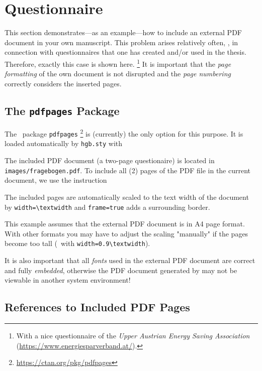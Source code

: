 \chapter{Questionnaire}
\label{app:Questionnaire}

This section demonstrates---as an example---how to include an external PDF
document in your own \latex manuscript. This problem arises relatively often, 
\eg, in connection with questionnaires that one has created and/or used in
the thesis. Therefore, exactly this case is shown here.%
\footnote{With a nice questionnaire of the \emph{Upper Austrian Energy Saving
Association} (\url{https://www.energiesparverband.at/}).} 
It is important that the \emph{page formatting} of the own document is not
disrupted and the \emph{page numbering} correctly considers the inserted
pages.


\section{The \texttt{pdfpages} Package}

The \latex\ package \texttt{pdfpages}%
\footnote{\url{https://ctan.org/pkg/pdfpages}}
is (currently) the only option for this purpose. It is loaded automatically
by \nolinkurl{hgb.sty} with
%
\begin{LaTeXCode}[numbers=none]
\RequirePackage{pdfpages}
\end{LaTeXCode}
%
The included PDF document (a two-page questionaire) is located in
\nolinkurl{images/fragebogen.pdf}. To include all (2) pages of the PDF file
in the current document, we use the instruction
%
\begin{LaTeXCode}[numbers=none]

\end{LaTeXCode}
%
The included pages are automatically scaled to the text width of the \latex document
by \verb!width=\textwidth! and \verb!frame=true! adds a surrounding border.

This example assumes that the external PDF document is in A4 page format.
With other formats you may have to adjust the scaling "manually" if the pages become
too tall (\eg\ with \verb!width=0.9\textwidth!).

It is also important that all \emph{fonts} used in the external PDF document are
correct and fully \emph{embedded}, otherwise the PDF document generated by \latex may
not be viewable in another system environment!


\section{References to Included PDF Pages}

